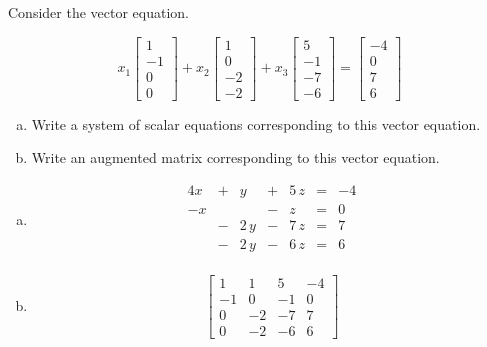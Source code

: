 
\begin{exerciseStatement}


Consider the vector equation.

\[ x_{1} \left[\begin{array}{c}
1 \\
-1 \\
0 \\
0
\end{array}\right] + x_{2} \left[\begin{array}{c}
1 \\
0 \\
-2 \\
-2
\end{array}\right] + x_{3} \left[\begin{array}{c}
5 \\
-1 \\
-7 \\
-6
\end{array}\right] = \left[\begin{array}{c}
-4 \\
0 \\
7 \\
6
\end{array}\right] \]
\begin{enumerate}[(a)]
\item  Write a system of scalar equations corresponding to this vector equation. 
\item  Write an augmented matrix corresponding to this vector equation. 
\end{enumerate}
    
\end{exerciseStatement}
    
\begin{exerciseAnswer} 

\begin{enumerate}[(a)]
\item 
\begin{alignat*}{4} x &+& y &+& 5 \, z &=& -4 \\-x & &  &-& z &=& 0 \\ &-& 2 \, y &-& 7 \, z &=& 7 \\ &-& 2 \, y &-& 6 \, z &=& 6 \\ \end{alignat*}
            
\item \[ \left[\begin{array}{ccc|c}
1 & 1 & 5 & -4 \\
-1 & 0 & -1 & 0 \\
0 & -2 & -7 & 7 \\
0 & -2 & -6 & 6
\end{array}\right] \]
\end{enumerate}
    
\end{exerciseAnswer}
    

